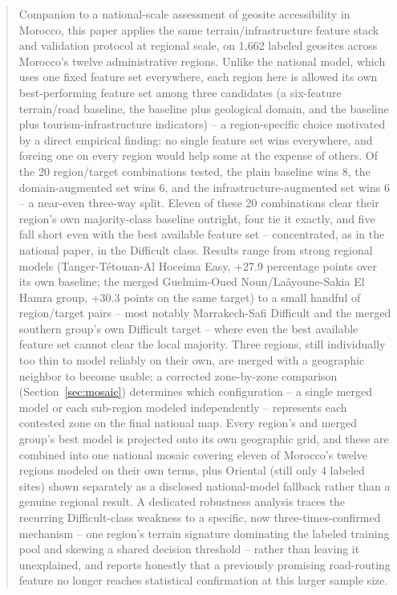 \documentclass[11pt,a4paper]{article}
\begin{document}
\begin{abstract}
\noindent\small
Companion to a national-scale assessment of geosite accessibility in Morocco, this paper applies the same terrain/infrastructure feature stack and validation protocol at regional scale, on 1{,}662 labeled geosites across Morocco's twelve administrative regions. Unlike the national model, which uses one fixed feature set everywhere, each region here is allowed its own best-performing feature set among three candidates (a six-feature terrain/road baseline, the baseline plus geological domain, and the baseline plus tourism-infrastructure indicators) -- a region-specific choice motivated by a direct empirical finding: no single feature set wins everywhere, and forcing one on every region would help some at the expense of others. Of the 20 region/target combinations tested, the plain baseline wins 8, the domain-augmented set wins 6, and the infrastructure-augmented set wins 6 -- a near-even three-way split. Eleven of these 20 combinations clear their region's own majority-class baseline outright, four tie it exactly, and five fall short even with the best available feature set -- concentrated, as in the national paper, in the Difficult class. Results range from strong regional models (Tanger-Tétouan-Al Hoceima Easy, +27.9 percentage points over its own baseline; the merged Guelmim-Oued Noun/Laâyoune-Sakia El Hamra group, +30.3 points on the same target) to a small handful of region/target pairs -- most notably Marrakech-Safi Difficult and the merged southern group's own Difficult target -- where even the best available feature set cannot clear the local majority. Three regions, still individually too thin to model reliably on their own, are merged with a geographic neighbor to become usable; a corrected zone-by-zone comparison (Section~\ref{sec:mosaic}) determines which configuration -- a single merged model or each sub-region modeled independently -- represents each contested zone on the final national map. Every region's and merged group's best model is projected onto its own geographic grid, and these are combined into one national mosaic covering eleven of Morocco's twelve regions modeled on their own terms, plus Oriental (still only 4 labeled sites) shown separately as a disclosed national-model fallback rather than a genuine regional result. A dedicated robustness analysis traces the recurring Difficult-class weakness to a specific, now three-times-confirmed mechanism -- one region's terrain signature dominating the labeled training pool and skewing a shared decision threshold -- rather than leaving it unexplained, and reports honestly that a previously promising road-routing feature no longer reaches statistical confirmation at this larger sample size.
\end{abstract}
\end{document}

